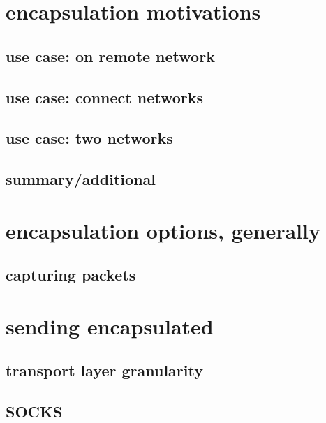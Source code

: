 
\section{encapsulation motivations}
\subsection{use case: on remote network}

\subsection{use case: connect networks}

\subsection{use case: two networks}



\subsection{summary/additional}




\section{encapsulation options, generally}


\subsection{capturing packets}


\section{sending encapsulated}

\subsection{transport layer granularity}


\subsection{SOCKS}


